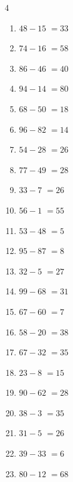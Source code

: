 \begin{multicols}{4}
\begin{enumerate}
  \item $48-15$
        $=33$

  \item $74-16$
        $=58$

  \item $86-46$
        $=40$

  \item $94-14$
        $=80$

  \item $68-50$
        $=18$

  \item $96-82$
        $=14$

  \item $54-28$
        $=26$

\columnbreak %

\resetques

  \item $77-49$
        $=28$

  \item $33-7$
        $=26$

  \item $56-1$
        $=55$

  \item $53-48$
        $=5$

  \item $95-87$
        $=8$

  \item $32-5$
        $=27$

  \item $99-68$
        $=31$

  \item $67-60$
        $=7$

  \item $58-20$
        $=38$

  \item $67-32$
        $=35$

  \item $23-8$
        $=15$

  \item $90-62$
        $=28$

  \item $38-3$
        $=35$

  \item $31-5$
        $=26$

  \item $39-33$
        $=6$

  \item $80-12$
        $=68$


\end{enumerate}
\end{multicols}
